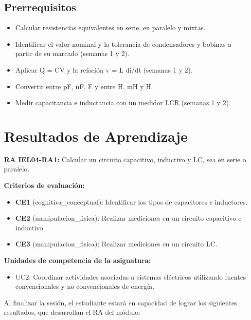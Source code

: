 \documentclass[11pt,letterpaper]{article}
\begin{document}
\subsection{Prerrequisitos}

\begin{itemize}
  \item Calcular resistencias equivalentes en serie, en paralelo y mixtas.
  \item Identificar el valor nominal y la tolerancia de condensadores y bobinas a partir de su marcado (semanas 1 y 2).
  \item Aplicar Q = CV y la relación v = L di/dt (semanas 1 y 2).
  \item Convertir entre pF, nF, \textmu{}F y entre \textmu{}H, mH y H.
  \item Medir capacitancia e inductancia con un medidor LCR (semanas 1 y 2).
\end{itemize}

\section{Resultados de Aprendizaje}

\begin{alineacion}
\textbf{RA IEL04-RA1:} Calcular un circuito capacitivo, inductivo y LC, sea en serie o paralelo.

\textbf{Criterios de evaluación:}

\begin{itemize}
  \item \textbf{CE1} (cognitiva\_conceptual): Identificar los tipos de capacitores e inductores.
  \item \textbf{CE2} (manipulacion\_fisica): Realizar mediciones en un circuito capacitivo e inductivo.
  \item \textbf{CE3} (manipulacion\_fisica): Realizar mediciones en un circuito LC.
\end{itemize}

\textbf{Unidades de competencia de la asignatura:}

\begin{itemize}
  \item UC2: Coordinar actividades asociadas a sistemas eléctricos utilizando fuentes convencionales y no convencionales de energía.
\end{itemize}
\end{alineacion}

Al finalizar la sesión, el estudiante estará en capacidad de lograr los siguientes resultados, que desarrollan el RA del módulo:
\end{document}
